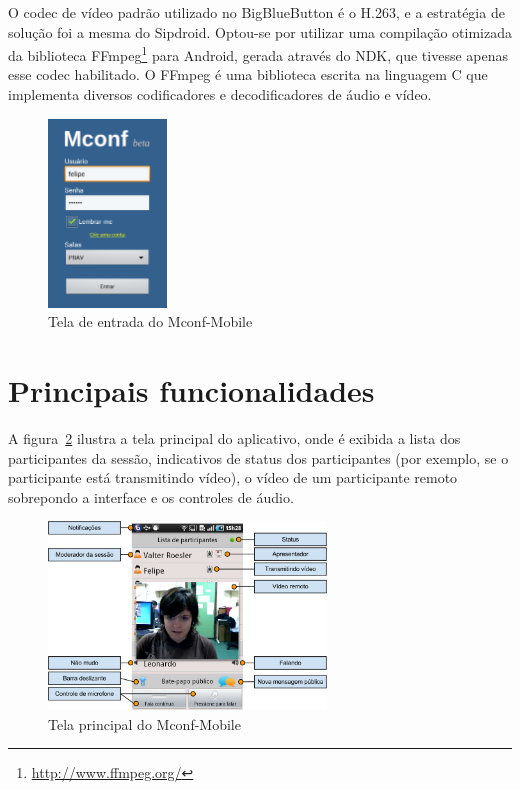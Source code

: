 \documentclass{acm_proc_article-sp}
\begin{document}
O codec de vídeo padrão utilizado no BigBlueButton é o H.263, e a estratégia de solução foi a mesma do Sipdroid. Optou-se por utilizar uma compilação otimizada da biblioteca FFmpeg\footnote{\url{http://www.ffmpeg.org/}} para Android, gerada através do NDK, que tivesse apenas esse codec habilitado. O FFmpeg é uma biblioteca escrita na linguagem C que implementa diversos codificadores e decodificadores de áudio e vídeo.

\begin{figure}[htp]
\centering
\includegraphics[height=50mm]{app3.png}
\caption{Tela de entrada do Mconf-Mobile}\label{fig:mconf-entrada}
\end{figure}

\section{Principais funcionalidades}

A figura~\ref{fig:mconf-mobile} ilustra a tela principal do aplicativo, onde é exibida a lista dos participantes da sessão, indicativos de status dos participantes (por exemplo, se o participante está transmitindo vídeo), o vídeo de um participante remoto sobrepondo a interface e os controles de áudio.

\begin{figure}[htp]
\centering
\includegraphics[height=50mm]{app2.png}
\caption{Tela principal do Mconf-Mobile}\label{fig:mconf-mobile}
\end{figure}
\end{document}
